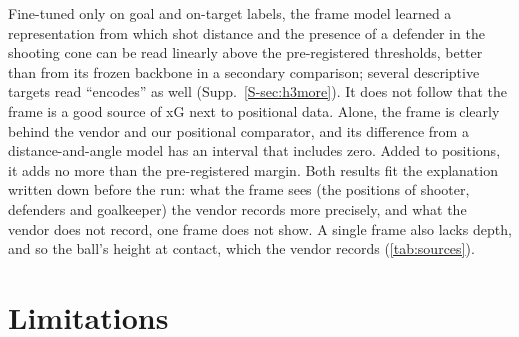 \documentclass[10pt,twocolumn,letterpaper]{article}
\begin{document}
Fine-tuned only on goal and on-target labels, the frame model learned a representation from which shot distance and
the presence of a defender in the shooting cone can be read linearly above the pre-registered thresholds, better than
from its frozen backbone in a secondary comparison; several descriptive targets read ``encodes'' as well
(Supp.~\cref{S-sec:h3more}). It does not follow that the frame is a good source of xG next to positional data. Alone,
the frame is clearly behind the vendor and our positional comparator, and its difference from a
distance-and-angle model has an interval that includes zero. Added to positions, it adds no more than the
pre-registered margin. Both results fit the explanation written down before the run: what the frame sees (the
positions of shooter, defenders and goalkeeper) the vendor records more precisely, and what the vendor does not
record, one frame does not show. A single frame also lacks depth, and so the ball's height at contact, which the
vendor records (\cref{tab:sources}).

\section{Limitations}
\label{sec:limitations}
\end{document}
